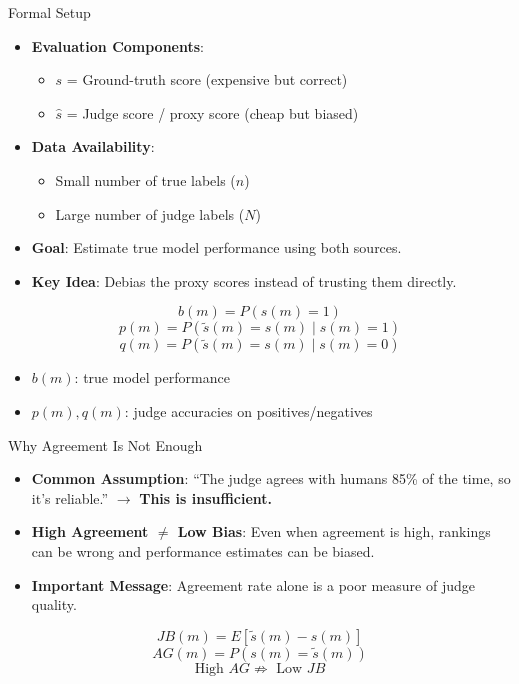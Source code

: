 \documentclass[10pt]{beamer}
\begin{document}
\begin{frame}{Formal Setup}
  \begin{itemize}
    \item \textbf{Evaluation Components}:
      \begin{itemize}
        \item $s$ = Ground-truth score (expensive but correct)
        \item $\hat{s}$ = Judge score / proxy score (cheap but biased)
      \end{itemize}
    \item \textbf{Data Availability}:
      \begin{itemize}
        \item Small number of true labels ($n$)
        \item Large number of judge labels ($N$)
      \end{itemize}
    \item \textbf{Goal}: Estimate true model performance using both sources.
    \item \textbf{Key Idea}: Debias the proxy scores instead of trusting them directly.
  \end{itemize}
  
  \vspace{0.4em}
  \[
    b(m)=P(s(m)=1)
  \]
  \[
    p(m)=P(\tilde{s}(m)=s(m)\mid s(m)=1)
  \]
  \[
    q(m)=P(\tilde{s}(m)=s(m)\mid s(m)=0)
  \]
  \begin{itemize}
    \item $b(m)$: true model performance
    \item $p(m), q(m)$: judge accuracies on positives/negatives
  \end{itemize}
\end{frame}

\begin{frame}{Why Agreement Is Not Enough}
  \begin{itemize}
    \item \textbf{Common Assumption}: ``The judge agrees with humans 85\% of the time, so it's reliable.'' $\rightarrow$ \textbf{This is insufficient.}
    \item \textbf{High Agreement $\neq$ Low Bias}: Even when agreement is high, rankings can be wrong and performance estimates can be biased.
    \item \textbf{Important Message}: Agreement rate alone is a poor measure of judge quality.
  \end{itemize}
  
  \vspace{0.4em}
  \[
    JB(m)=E[\tilde{s}(m)-s(m)]
  \]
  \[
    AG(m)=P(s(m)=\tilde{s}(m))
  \]
  \[
    \text{High }AG \not\Rightarrow \text{ Low }JB
  \]
\end{frame}
\end{document}
